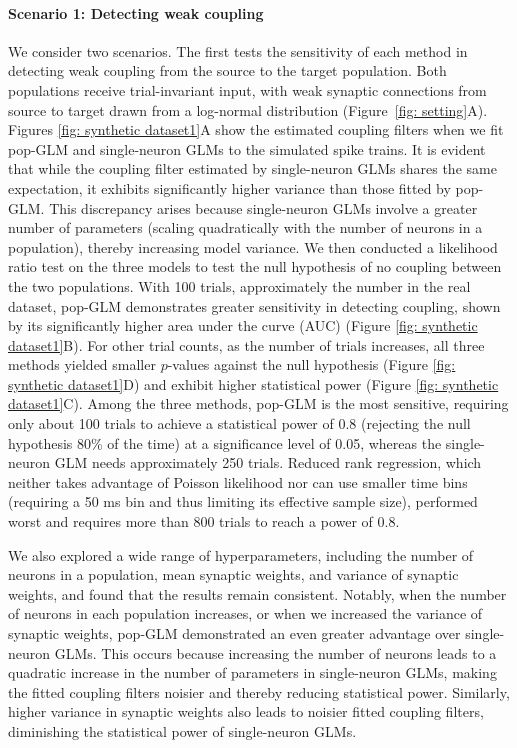 \documentclass[12pt]{article}
\begin{document}
\paragraph{Scenario 1: Detecting weak coupling}
We consider two scenarios. The first tests the sensitivity of each method in detecting weak coupling from the source to the target population. Both populations receive trial-invariant input, with weak synaptic connections from source to target drawn from a log-normal distribution (Figure~\ref{fig: setting}A). Figures \ref{fig: synthetic dataset1}A show the estimated coupling filters when we fit pop-GLM and single-neuron GLMs to the simulated spike trains. It is evident that while the coupling filter estimated by single-neuron GLMs shares the same expectation, it exhibits significantly higher variance than those fitted by pop-GLM. This discrepancy arises because single-neuron GLMs involve a greater number of parameters (scaling quadratically with the number of neurons in a population), thereby increasing model variance. We then conducted a likelihood ratio test on the three models to test the null hypothesis of no coupling between the two populations. With 100 trials, approximately the number in the real dataset, pop-GLM demonstrates greater sensitivity in detecting coupling, shown by its significantly higher area under the curve (AUC) (Figure \ref{fig: synthetic dataset1}B). For other trial counts, as the number of trials increases, all three methods yielded smaller $p$-values against the null hypothesis (Figure \ref{fig: synthetic dataset1}D) and exhibit higher statistical power (Figure \ref{fig: synthetic dataset1}C). Among the three methods, pop-GLM is the most sensitive, requiring only about 100 trials to achieve a statistical power of 0.8 (rejecting the null hypothesis 80\% of the time) at a significance level of 0.05, whereas the single-neuron GLM needs approximately 250 trials. Reduced rank regression, which neither takes advantage of Poisson likelihood nor can use smaller time bins (requiring a 50 ms bin and thus limiting its effective sample size), performed worst and requires more than 800 trials to reach a power of 0.8.

We also explored a wide range of hyperparameters, including the number of neurons in a population, mean synaptic weights, and variance of synaptic weights, and found that the results remain consistent. Notably, when the number of neurons in each population increases, or when we increased the variance of synaptic weights, pop-GLM demonstrated an even greater advantage over single-neuron GLMs. This occurs because increasing the number of neurons leads to a quadratic increase in the number of parameters in single-neuron GLMs, making the fitted coupling filters noisier and thereby reducing statistical power. Similarly, higher variance in synaptic weights also leads to noisier fitted coupling filters, diminishing the statistical power of single-neuron GLMs.
\end{document}
